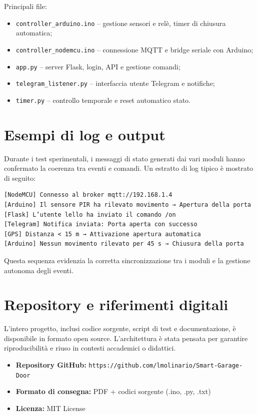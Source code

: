 Principali file:
\begin{itemize}
    \item \texttt{controller\_arduino.ino} – gestione sensori e relè, timer di chiusura automatica;
    \item \texttt{controller\_nodemcu.ino} – connessione MQTT e bridge seriale con Arduino;
     \item \texttt{app.py} – server Flask, login, API e gestione comandi;
    \item \texttt{telegram\_listener.py} – interfaccia utente Telegram e notifiche;
    \item \texttt{timer.py} – controllo temporale e reset automatico stato.
\end{itemize}

\section{Esempi di log e output}
Durante i test sperimentali, i messaggi di stato generati dai vari moduli hanno confermato la coerenza tra eventi e comandi.
Un estratto di log tipico è mostrato di seguito:

\begin{verbatim}
[NodeMCU] Connesso al broker mqtt://192.168.1.4
[Arduino] Il sensore PIR ha rilevato movimento → Apertura della porta
[Flask] L’utente lello ha inviato il comando /on
[Telegram] Notifica inviata: Porta aperta con successo
[GPS] Distanza < 15 m → Attivazione apertura automatica
[Arduino] Nessun movimento rilevato per 45 s → Chiusura della porta
\end{verbatim}

Questa sequenza evidenzia la corretta sincronizzazione tra i moduli e la gestione autonoma degli eventi.

\section{Repository e riferimenti digitali}
L’intero progetto, inclusi codice sorgente, script di test e documentazione, è disponibile in formato open source.
L’architettura è stata pensata per garantire riproducibilità e riuso in contesti accademici o didattici.

\begin{itemize}
    \item \textbf{Repository GitHub:} \texttt{https://github.com/lmolinario/Smart-Garage-Door}
    \item \textbf{Formato di consegna:} PDF + codici sorgente (.ino, .py, .txt)
    \item \textbf{Licenza:} MIT License
\end{itemize}

